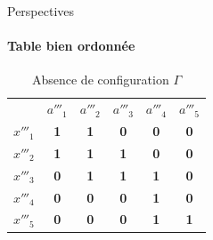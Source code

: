 \documentclass{beamer}
\begin{document}
  \begin{frame}{Perspectives}
  \framesubtitle{Table bien ordonnée}
	\begin{table}[htb]
	  \centering

	\begin{tabular}{lccccc}
	& $a'''_1$ & $a'''_2$ & $a'''_3$ & $a'''_4$ & $a'''_5$\\
	$x'''_1$ & \textbf{1} & \textbf{1} & \textbf{0} & \textbf{0} & \textbf{0}\\
	$x'''_2$ & \textbf{1} & \textbf{1} & \textbf{1} & \textbf{0} & \textbf{0}\\
	$x'''_3$ & \textbf{0} & \textbf{1} & \textbf{1} & \textbf{1} & \textbf{0}\\
	$x'''_4$ & \textbf{0} & \textbf{0} & \textbf{0} & \textbf{1} & \textbf{0}\\
	$x'''_5$ & \textbf{0} & \textbf{0} & \textbf{0} & \textbf{1} & \textbf{1}
	\end{tabular}
   \caption{Absence de configuration $\Gamma$}
	\end{table}
  \end{frame}




  
\end{document}
